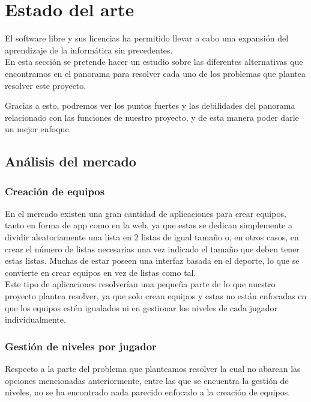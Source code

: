 \chapter{Estado del arte}

El software libre y sus licencias \cite{gplv3} ha permitido llevar a cabo una expansión del
aprendizaje de la informática sin precedentes.\\

En esta sección se pretende hacer un estudio sobre las diferentes alternativas
que encontramos en el panorama para resolver cada uno de los problemas que plantea
resolver este proyecto.

Gracias a esto, podremos ver los puntos fuertes y las debilidades del panorama relacionado
con las funciones de nuestro proyecto, y de esta manera poder darle un mejor enfoque.

\section{Análisis del mercado}

\subsection{Creación de equipos}

En el mercado existen una gran cantidad de aplicaciones para crear equipos, tanto en forma de app como en la web,
ya que estas se dedican simplemente a dividir aleatoriamente una lista en 2 listas de igual tamaño o, en otros casos,
en crear el número de listas necesarias una vez indicado el tamaño que deben tener estas listas.
Muchas de estar poseen una interfaz basada en el deporte, lo que se convierte en crear equipos en vez de listas como tal.\\

Este tipo de aplicaciones resolverían una pequeña parte de lo que nuestro proyecto plantea resolver, ya que solo crean equipos
y estas no están enfocadas en que los equipos estén igualados ni en gestionar los niveles de cada jugador individualmente.

\newpage

\subsection{Gestión de niveles por jugador}

Respecto a la parte del problema que planteamos resolver la cual no abarcan las opciones mencionadas anteriormente, entre las que
se encuentra la gestión de niveles, no se ha encontrado nada parecido enfocado a la creación de equipos.

